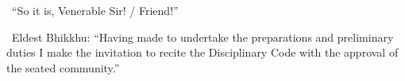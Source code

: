 \begin{center}
  \anglebracketleft\ \hspace{-0.5mm}``So it is, Venerable Sir! / Friend!'' \hspace{-0.5mm}\anglebracketright\
\end{center}

\begin{center}
  \anglebracketleft\ \hspace{-0.5mm}Eldest Bhikkhu: ``Having made to undertake the preparations and preliminary duties I make the invitation to recite the Disciplinary Code with the approval of the seated community.'' \hspace{-0.5mm}\anglebracketright\
\end{center}

\clearpage
